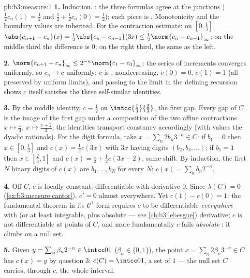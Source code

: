 \begin{solution}{pb:b3:measure:1}
\textbf{1.} Induction. : the three formulas agree at
the junctions ($\frac12c_n(1) = \frac12$ and $\frac12 +
\frac12c_n(0) = \frac12$); each piece is .
Monotonicity and the boundary values are inherited. For the
contraction estimate: on $[0,\frac13]$, $\abs{c_{n+1} - c_n}(x)
= \frac12\abs{c_n - c_{n-1}}(3x) \leq \frac12\norm{c_n -
c_{n-1}}_\infty$; on the middle third the difference is $0$; on
the right third, the same as the left.

\textbf{2.} $\norm{c_{n+1} - c_n}_\infty \leq
2^{-n}\norm{c_1 - c_0}_\infty$: the series of increments
converges uniformly, so $c_n \to c$ uniformly; $c$ is
, nondecreasing, $c(0) = 0$, $c(1) = 1$ (all
preserved by uniform limits), and passing to the limit in the
defining recursion shows $c$ itself satisfies the three
self-similar identities.

\textbf{3.} By the middle identity, $c \equiv \frac12$ on
$\intcc{\frac13}{\frac23}$, the first gap. Every gap of $C$ is
the image of the first gap under a composition of the two
affine contractions $x \mapsto \frac x3$, $x\mapsto\frac{x +
2}3$; the identities transport constancy accordingly (with
values the dyadic rationals). For the digit formula, take $x =
\sum_n 2b_n3^{-n} \in C$: if $b_1 = 0$ then $x \in
[0,\frac13]$ and $c(x) = \frac12c(3x)$ with $3x$ having digits
$(b_2, b_3, \dots)$; if $b_1 = 1$ then $x \in [\frac23, 1]$
and $c(x) = \frac12 + \frac12c(3x - 2)$, same shift. By
induction, the first $N$ binary digits of $c(x)$ are $b_1,
\dots, b_N$ for every $N$: $c(x) = \sum_nb_n2^{-n}$.

\textbf{4.} Off $C$, $c$ is locally constant: differentiable
with derivative $0$. Since $\lambda(C) = 0$
(\cref{ex:b3:measure:cantor}), $c' = 0$ almost everywhere. Yet
$c(1) - c(0) = 1$: the fundamental theorem in its $\mathcal
C^1$ form requires $c$ to be differentiable \emph{everywhere}
with  (or at least integrable, plus absolute
 --- see \cref{ch:b3:lebesgue}) derivative; $c$ is
not differentiable at points of $C$, and more fundamentally $c$
fails \emph{absolute }: it climbs on a null set.

\textbf{5.} Given $y = \sum_n\beta_n2^{-n} \in \intcc01$
($\beta_n \in \{0,1\}$), the point $x = \sum_n2\beta_n3^{-n}
\in C$ has $c(x) = y$ by question 3: $c(C) = \intcc01$, a set
of  $1$ --- the null set $C$ carries, through $c$, the
whole interval.


\end{solution}
